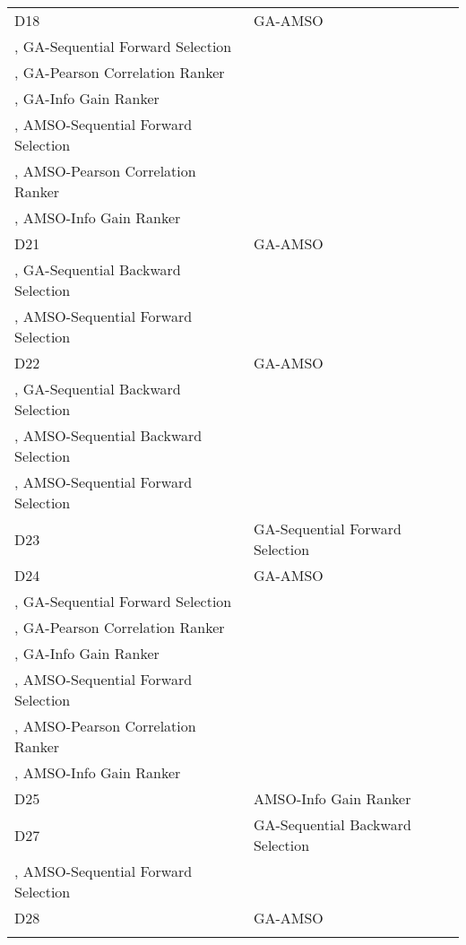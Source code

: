 \begin{table}
\begin{tabular}{ll}
D18&GA-AMSO\\
, GA-Sequential Forward Selection\\
, GA-Pearson Correlation Ranker\\
, GA-Info Gain Ranker\\
, AMSO-Sequential Forward Selection\\
, AMSO-Pearson Correlation Ranker\\
, AMSO-Info Gain Ranker\\
D21&GA-AMSO\\
, GA-Sequential Backward Selection\\
, AMSO-Sequential Forward Selection\\
D22&GA-AMSO\\
, GA-Sequential Backward Selection\\
, AMSO-Sequential Backward Selection\\
, AMSO-Sequential Forward Selection\\
D23&GA-Sequential Forward Selection\\
D24&GA-AMSO\\
, GA-Sequential Forward Selection\\
, GA-Pearson Correlation Ranker\\
, GA-Info Gain Ranker\\
, AMSO-Sequential Forward Selection\\
, AMSO-Pearson Correlation Ranker\\
, AMSO-Info Gain Ranker\\
D25&AMSO-Info Gain Ranker\\
D27&GA-Sequential Backward Selection\\
, AMSO-Sequential Forward Selection\\
D28&GA-AMSO\\
\noalign{\smallskip}\hline
\end{tabular}
\end{table}
